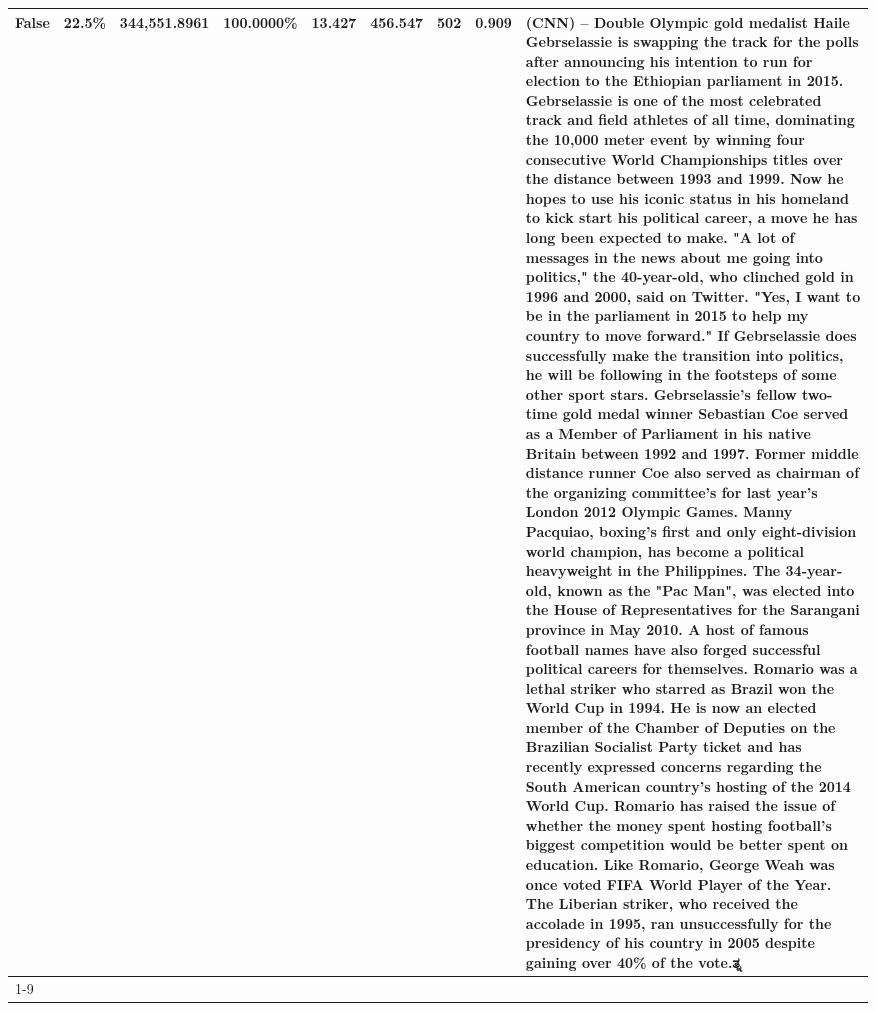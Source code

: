 \begin{table}[H]
{\begin{tabular}{lllrlllll}
False & 22.5\% & 344,551.8961 & \bfseries \color{red} 100.0000\% & 13.427 & 456.547 & 502 & 0.909 & (CNN) -- Double Olympic gold medalist Haile Gebrselassie is swapping the track for the polls after announcing his intention to run for election to the Ethiopian parliament in 2015. Gebrselassie is one of the most celebrated track and field athletes of all time, dominating the 10,000 meter event by winning four consecutive World Championships titles over the distance between 1993 and 1999. Now he hopes to use his iconic status in his homeland to kick start his political career, a move he has long been expected to make. "A lot of messages in the news about me going into politics," the 40-year-old, who clinched gold in 1996 and 2000, said on Twitter. "Yes, I want to be in the parliament in 2015 to help my country to move forward." If Gebrselassie does successfully make the transition into politics, he will be following in the footsteps of some other sport stars. Gebrselassie's fellow two-time gold medal winner Sebastian Coe served as a Member of Parliament in his native Britain between 1992 and 1997. Former middle distance runner Coe also served as chairman of the organizing committee's for last year's London 2012 Olympic Games. Manny Pacquiao, boxing's first and only eight-division world champion, has become a political heavyweight in the Philippines. The 34-year-old, known as the "Pac Man", was elected into the House of Representatives for the Sarangani province in May 2010. A host of famous football names have also forged successful political careers for themselves. Romario was a lethal striker who starred as Brazil won the World Cup in 1994. He is now an elected member of the Chamber of Deputies on the Brazilian Socialist Party ticket and has recently expressed concerns regarding the South American country's hosting of the 2014 World Cup. Romario has raised the issue of whether the money spent hosting football's biggest competition would be better spent on education. Like Romario, George Weah was once voted FIFA World Player of the Year. The Liberian striker, who received the accolade in 1995, ran unsuccessfully for the presidency of his country in 2005 despite gaining over 40\% of the vote.ತ್ನ \\
\cline{1-9}

\end{tabular}}
\end{table}

